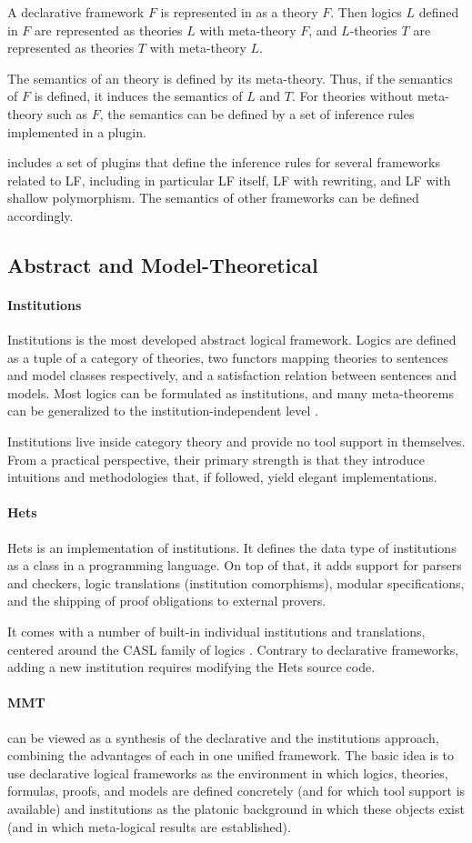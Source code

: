 \documentclass[12pt]{article}
\newcommand{\system}[2][]{\paragraph{#2}#2 \ifnonempty[\cite{#2}]{#1}{\cite{#1}}}
\begin{document}
A declarative framework $F$ is represented in \mmt as a theory $F$.
Then logics $L$ defined in $F$ are represented as theories $L$ with meta-theory $F$, and $L$-theories $T$ are represented as theories $T$ with meta-theory $L$.

The semantics of an \mmt theory is defined by its meta-theory.
Thus, if the semantics of $F$ is defined, it induces the semantics of $L$ and $T$.
For theories without meta-theory such as $F$, the semantics can be defined by a set of inference rules implemented in a plugin.

\mmt includes a set of plugins that define the inference rules for several frameworks related to LF, including in particular LF itself, LF with rewriting, and LF with shallow polymorphism.
The semantics of other frameworks can be defined accordingly.

\subsection{Abstract and Model-Theoretical}

\system{Institutions} is the most developed abstract logical framework.
Logics are defined as a tuple of a category of theories, two functors mapping theories to sentences and model classes respectively, and a satisfaction relation between sentences and models.
Most logics can be formulated as institutions, and many meta-theorems can be generalized to the institution-independent level \cite{institutionindependent}.

Institutions live inside category theory and provide no tool support in themselves.
From a practical perspective, their primary strength is that they introduce intuitions and methodologies that, if followed, yield elegant implementations.

\system{Hets} is an implementation of institutions.
It defines the data type of institutions as a class in a programming language.
On top of that, it adds support for parsers and checkers, logic translations (institution comorphisms), modular specifications, and the shipping of proof obligations to external provers.

It comes with a number of built-in individual institutions and translations, centered around the CASL family of logics \cite{caslmanual}.
Contrary to declarative frameworks, adding a new institution requires modifying the Hets source code.

\paragraph{MMT}
\cite{rabe:howto:14,rabe:combining:10} can be viewed as a synthesis of the declarative and the institutions approach, combining the advantages of each in one unified framework.
The basic idea is to use declarative logical frameworks as the environment in which logics, theories, formulas, proofs, and models are defined concretely (and for which tool support is available) and institutions as the platonic background in which these objects exist (and in which meta-logical results are established).
\end{document}
